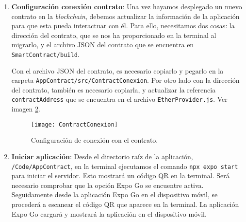 \begin{enumerate}
	\begin{itemize}
	\item \textbf{Migrar}: Finalmente, el último paso es desplegar el contrato en la \textit{blockchain}.
	Esto se realiza desde el directorio \texttt{SmartContract} usando el comando \texttt{truffle migrate}.
	Este comando desplegará los contratos inteligentes en la red configurada, en este caso Ganache y generará
	los archivos necesarios en el directorio \texttt{build/contracts}.
	Tras una correcta migración, se mostrará la dirección del contrato, la cuenta del creador, el costo total
	del despliegue, etcétera. 	
Ver imagen \ref{img:TruffleMigrate}.
	\end{itemize}
	
\begin{figure}[h]
	\label{img:TruffleMigrate}
	\centering
	\texttt{[image: TruffleMigrate]}
	\caption[Despliegue smart contract]{Despliegue del contrato en la red de Ganache usando Truffle.}
\end{figure}	
	
	
\item \textbf{Configuración conexión contrato}: Una vez hayamos desplegado un nuevo contrato en la \textit{blockchain}, debemos actualizar la información de la aplicación para que esta pueda interactuar con él.
Para ello, necesitamos dos cosas: la dirección del contrato, que se nos ha proporcionado en la terminal al migrarlo, y el archivo JSON del contrato que se encuentra en \texttt{SmartContract/build}.
	
Con el archivo JSON del contrato, es necesario copiarlo y pegarlo en la carpeta \texttt{AppContract/src/ContractConexion}. 
Por otro lado con la dirección del contrato, también es necesario copiarla, y actualizar la referencia \texttt{contractAddress} que se encuentra en el archivo \texttt{EtherProvider.js}.
Ver imagen \ref{img:ContractConexion}.

\begin{figure}[h]
	\label{img:ContractConexion}
	\centering
	\texttt{[image: ContractConexion]}
	\caption[Conexión con el contrato]{Configuración de conexión con el contrato.}
\end{figure}	

\item \textbf{Iniciar aplicación}: Desde el directorio raíz de la aplicación, \texttt{/Code/AppContract}, en la terminal ejecutamos el comando \texttt{npx expo start} para iniciar el servidor. Esto mostrará un código QR en la terminal. Será necesario comprobar que la opción Expo Go se encuentre activa.
Seguidamente desde la aplicación Expo Go en el dispositivo móvil, se procederá a escanear el código QR que aparece en la terminal.
La aplicación Expo Go cargará y mostrará la aplicación en el dispositivo móvil.

\end{enumerate}

